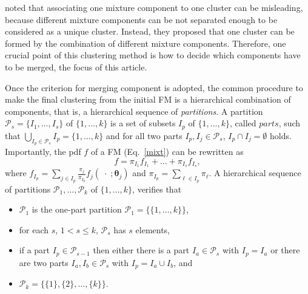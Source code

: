 \documentclass[10pt, a4paper]{article}
\newcommand{\m}[1]{\boldsymbol{#1}}
\begin{document}
\begin{spacing}{1.9}
\cite{lee2004combining,hennig2010methods,baudry2010combining,melnykov2013distribution,pastore2013merging} noted that associating one mixture component to one cluster can be misleading, because different mixture components can be not separated enough to be considered as a unique cluster. Instead, they proposed that one cluster can be formed by the combination of different mixture components. Therefore, one crucial point of this clustering method is how to decide which components have to be merged, the focus of this article.

Once the criterion for merging component is adopted, the common procedure to make the final clustering from the initial FM is a hierarchical combination of components, that is, a hierarchical sequence of \emph{partitions}. A partition $\mathcal{P}_s=\{ I_1, \dots, I_s\}$ of $\{1, \dots, k\}$ is a set of subsets $I_p$ of $\{1, \dots, k\}$, called $parts$, such that $\bigcup_{I_p \in \mathcal{P}_s} I_p = \{1, \dots, k\}$ and for all two parts $I_p, I_j \in \mathcal{P}_s$, $I_p \cap I_j = \emptyset$ holds. Importantly, the pdf $f$ of a FM (Eq.~\ref{mixt}) can be rewritten as
\begin{equation}
f = \pi_{I_1} f_{I_1} + \dots + \pi_{I_s} f_{I_s},
\label{mixt_part}
\end{equation}
where $f_{I_p} = \sum_{j \in I_p} \frac{\pi_j}{\pi_{I_p}} f_j(\;\cdot\; ; \m\theta_j)$ and $\pi_{I_p} = \sum_{\ell \in I_p} \pi_\ell$. A hierarchical sequence of partitions $\mathcal{P}_1, \dots, \mathcal{P}_k$ of $\{1,...,k\}$, verifies that
  
\begin{itemize}
\item $\mathcal{P}_1$ is the one-part partition $\mathcal{P}_1 = \{ \{1, \dots, k\} \}$,
\item for each $s$, $1 <  s \leq k$, $\mathcal{P}_{s}$ has $s$ elements,
\item if a part $I_p \in \mathcal{P}_{s-1}$ then either there is a part $I_a \in \mathcal{P}_{s}$ with $I_p = I_a$ or there are two parts $I_a, I_b \in \mathcal{P}_s$ with $I_p = I_a \cup I_b$, and
\item $\mathcal{P}_k= \{ \{1\},\{2\}, \dots, \{k\} \}$.
\end{itemize}


\end{spacing}
\end{document}
